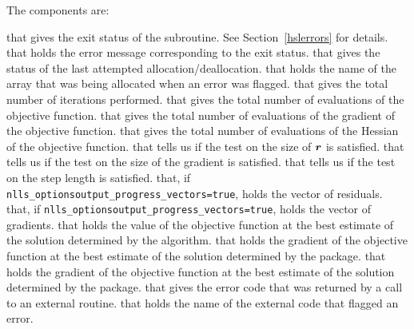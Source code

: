 
The components are:
\begin{description}
that gives the exit status of the subroutine.  See Section~\ref{hslerrors} for details.
 that holds the error message corresponding to the exit status.
 that gives the status of the last attempted allocation/deallocation.
 that holds the name of the array that was being allocated when an error was flagged.
 that gives the total number of iterations performed.
 that gives the total number of evaluations of the objective function.
 that gives the total number of evaluations of the gradient of the objective function.
 that gives the total number of evaluations of the Hessian of the objective function.
 that tells us if the test on the size of \({\bm r}\) is satisfied.
 that tells us if the test on the size of the gradient is satisfied.
 that tells us if the test on the step length is satisfied.
 that, if {\tt nlls\_options\ct output\_progress\_vectors=true}, holds the vector of residuals.
 that, if {\tt nlls\_options\ct output\_progress\_vectors=true}, holds the vector of gradients.
 that holds the value of the objective function at the best estimate of the solution determined by the algorithm.
 that holds the gradient of the objective function at the best estimate of the solution determined by the package.
 that holds the gradient of the objective function at the best estimate of the solution determined by the package.
 that gives the error code that was returned by a call to an external routine.
 that holds the name of the external code that flagged an error.
\end{description}


